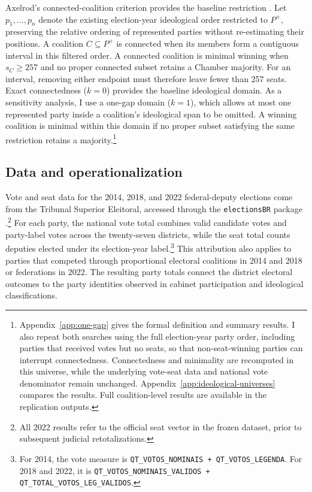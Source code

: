 \documentclass[11pt]{article}
\begin{document}
Axelrod's connected-coalition criterion provides the baseline restriction
\parencite{axelrod1970conflict}. Let \(p_1,\ldots,p_n\) denote the existing election-year ideological order
restricted to \(P^+\), preserving the relative ordering of represented parties
without re-estimating their positions. A coalition \(C\subseteq P^+\) is connected when
its members form a contiguous interval in this filtered order. A connected
coalition is minimal winning when \(s_C\geq257\) and no proper connected subset
retains a Chamber majority. For an interval, removing either endpoint must
therefore leave fewer than 257 seats. Exact connectedness (\(k=0\)) provides the
baseline ideological domain. As a sensitivity analysis, I use a one-gap domain (\(k=1\)), which
allows at most one represented party inside a coalition's ideological
span to be omitted. A winning coalition is minimal within this domain
if no proper subset satisfying the same restriction retains a majority.\footnote{
Appendix~\ref{app:one-gap} gives the formal definition and summary results.
I also repeat both searches using the full election-year party order,
including parties that received votes but no seats, so that
non-seat-winning parties can interrupt connectedness. Connectedness and
minimality are recomputed in this universe, while the underlying vote-seat
data and national vote denominator remain unchanged.
Appendix~\ref{app:ideological-universes} compares the results.
Full coalition-level results are available in the replication outputs.}


\subsection{Data and operationalization}
\label{sec:data}

Vote and seat data for the 2014, 2018, and 2022 federal-deputy elections
come from the Tribunal Superior Eleitoral, accessed through the
\texttt{electionsBR} package \parencite{electionsbr}.\footnote{All 2022
results refer to the official seat vector in the frozen dataset, prior
to subsequent judicial retotalizations.} For each party, the national
vote total combines valid candidate votes and party-label votes across
the twenty-seven districts, while the seat total counts deputies elected
under its election-year label.\footnote{For 2014, the vote measure is
\texttt{QT\_VOTOS\_NOMINAIS + QT\_VOTOS\_LEGENDA}. For 2018 and 2022,
it is \texttt{QT\_VOTOS\_NOMINAIS\_VALIDOS +
QT\_TOTAL\_VOTOS\_LEG\_VALIDOS}.} This attribution also applies to
parties that competed through proportional electoral coalitions in
2014 and 2018 or federations in 2022. The resulting party totals connect
the district electoral outcomes to the party identities observed in
cabinet participation and ideological classifications.
\end{document}
